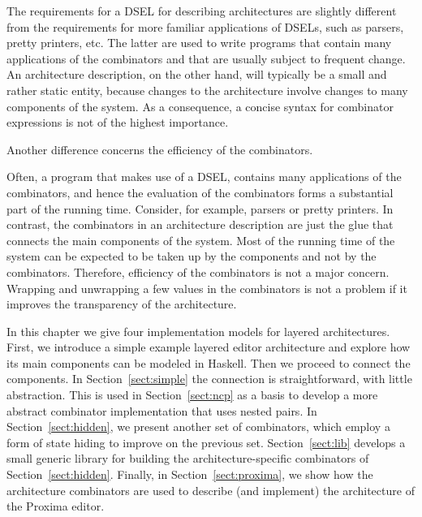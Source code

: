 \documentclass[preprint,natbib]{sigplanconf}
\begin{document}
\bc
The requirements for a DSEL for describing architectures are slightly different from the requirements for more familiar applications of DSELs, such as parsers, pretty printers, etc. The latter are used to write programs that contain many applications of the combinators and that are usually subject to frequent change. An architecture description, on the other hand, will typically be a small and rather static entity, because changes to the architecture involve changes to many components of the system.  As a consequence, a concise syntax for combinator expressions is not of the highest importance.
\ec

\bc Another difference concerns the efficiency of the combinators.\ec 

Often, a program that makes use of a DSEL, contains many applications of the combinators, and hence the evaluation of the combinators forms a substantial part of the running time. Consider, for example, parsers or pretty printers. In contrast, the combinators in an architecture description are just the glue that connects the main components of the system. Most of the running time of the system can be expected to be taken up by the components and not by the combinators. Therefore, efficiency of the combinators is not a major concern. Wrapping and unwrapping a few values in the combinators is not a problem if it improves the transparency of the architecture.

In this chapter we give four implementation models for layered architectures. First, we introduce a simple example layered editor architecture and explore how its main components can be modeled in Haskell. Then we proceed to connect the components. In Section~\ref{sect:simple} the connection is straightforward, with little abstraction. This is used in Section~\ref{sect:ncp} as a basis to develop a more abstract combinator implementation that uses nested pairs. In Section~\ref{sect:hidden}, we present another set of combinators, which employ a form of state hiding to improve on the previous set. Section~\ref{sect:lib} develops a small generic library for building the architecture-specific combinators of Section~\ref{sect:hidden}. Finally, in Section~\ref{sect:proxima}, we show how the architecture combinators are used to describe (and implement) the architecture of  the Proxima editor.%



%																
%																
%																
\end{document}
